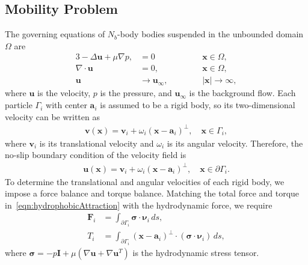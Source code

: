\documentclass[lineno]{jfm}
\renewcommand{\aa}{\mathbf{a}}
\newcommand{\bd}{\partial}
\newcommand{\FF}{\mathbf{F}}
\newcommand{\nnu}{\boldsymbol{\nu}}
\newcommand{\ssigma}{\boldsymbol{\sigma}}
\newcommand{\xx}{\mathbf{x}}
\newcommand{\uu}{\mathbf{u}}
\renewcommand{\vv}{\mathbf{v}}
\begin{document}


\subsection{\label{mobility}Mobility Problem}

The governing equations of $N_b$-body bodies suspended in the unbounded
domain $\Omega$ are
\begin{alignat}{3}
  -\Delta \uu + \mu\nabla p, &= 0 \qquad \qquad && \xx \in \Omega, \\
  \nabla\cdot \uu &= 0, \qquad && \xx \in \Omega, \\
  \uu &\to \uu_\infty, && |\xx| \to \infty,
\end{alignat}
%
where $\uu$ is the velocity, $p$ is the pressure, and $\uu_\infty$ is
the background flow. Each particle $\Gamma_i$ with center $\aa_i$ is
assumed to be a rigid body, so its two-dimensional velocity can be
written as
\begin{align}
  \vv(\xx) = \vv_i + \omega_i (\xx - \aa_i)^\perp, \quad 
    \xx \in \Gamma_i,
\end{align}
where $\vv_i$ is its translational velocity and $\omega_i$ is its
angular velocity. Therefore, the no-slip boundary condition of
the velocity field is 
\begin{align}
  \uu(\xx) = \vv_i + \omega_i (\xx - \aa_i)^\perp, \quad
    \xx \in \bd\Gamma_i.
\end{align}
To determine the translational and angular velocities of each rigid
body, we impose a force balance and torque balance. Matching the total
force and torque in~\eqref{eqn:hydrophobicAttraction} with the
hydrodynamic force, we require
\begin{align}
  \label{eqn:force}
  \FF_i &= \int_{\bd\Gamma_i} \ssigma \cdot \nnu_i \, ds, \\
  \label{eqn:torque}
  T_i &= \int_{\bd\Gamma_i} (\xx - \aa_i)^\perp \cdot 
    (\ssigma \cdot \nnu_i) \, ds,
\end{align}
where $\ssigma = -p \mathbf{I} + \mu \left(\nabla \uu + \nabla \uu^T
\right)$ is the hydrodynamic stress tensor.
\end{document}

